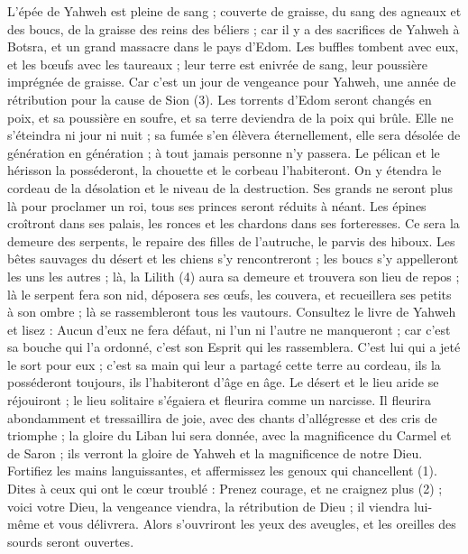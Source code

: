 \begin{multicols}{2}
{L'épée de Yahweh est pleine de sang ; couverte de graisse, du sang des agneaux et des boucs, de la graisse des reins des béliers ; car il y a des sacrifices de Yahweh à Botsra, et un grand massacre dans le pays d'Edom.
Les buffles tombent avec eux, et les bœufs avec les taureaux ; leur terre est enivrée de sang, leur poussière imprégnée de graisse.
Car c’est un jour de vengeance pour Yahweh, une année de rétribution pour la cause de Sion (3).
Les torrents d’Edom seront changés en poix, et sa poussière en soufre, et sa terre deviendra de la poix qui brûle.
Elle ne s’éteindra ni jour ni nuit ; sa fumée s’en élèvera éternellement, elle sera désolée de génération en génération ; à tout jamais personne n’y passera.
Le pélican et le hérisson la posséderont, la chouette et le corbeau l’habiteront. On y étendra le cordeau de la désolation et le niveau de la destruction.
Ses grands ne seront plus là pour proclamer un roi, tous ses princes seront réduits à néant.
Les épines croîtront dans ses palais, les ronces et les chardons dans ses forteresses. Ce sera la demeure des serpents, le repaire des filles de l’autruche, le parvis des hiboux.
Les bêtes sauvages du désert et les chiens s’y rencontreront ; les boucs s’y appelleront les uns les autres ; là, la Lilith (4) aura sa demeure et trouvera son lieu de repos ;
là le serpent fera son nid, déposera ses œufs, les couvera, et recueillera ses petits à son ombre ; là se rassembleront tous les vautours.
Consultez le livre de Yahweh et lisez : Aucun d’eux ne fera défaut, ni l’un ni l’autre ne manqueront ; car c'est sa bouche qui l'a ordonné, c’est son Esprit qui les rassemblera.
C’est lui qui a jeté le sort pour eux ; c’est sa main qui leur a partagé cette terre au cordeau, ils la posséderont toujours, ils l’habiteront d'âge en âge.
\VerseOne{}Le désert et le lieu aride se réjouiront ; le lieu solitaire s'égaiera et fleurira comme un narcisse.
Il fleurira abondamment et tressaillira de joie, avec des chants d’allégresse et des cris de triomphe ; la gloire du Liban lui sera donnée, avec la magnificence du Carmel et de Saron ; ils verront la gloire de Yahweh et la magnificence de notre Dieu.
Fortifiez les mains languissantes, et affermissez les genoux qui chancellent (1).
Dites à ceux qui ont le cœur troublé : Prenez courage, et ne craignez plus (2) ; voici votre Dieu, la vengeance viendra, la rétribution de Dieu ; il viendra lui-même et vous délivrera.
Alors s’ouvriront les yeux des aveugles, et les oreilles des sourds seront ouvertes.
}
\end{multicols}
